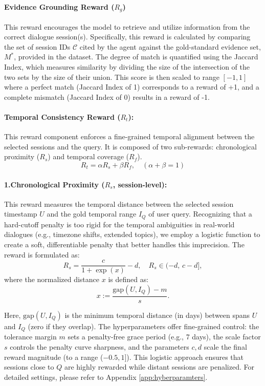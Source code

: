 \documentclass{article} %
\begin{document}
\paragraph{Evidence Grounding Reward ($R_g$)} 
This reward encourages the model to retrieve and utilize information from the correct dialogue session(s). Specifically, this reward is calculated by comparing the set of session IDs $\mathcal{C}$ cited by the agent against the gold-standard evidence set, $M^*$, provided in the dataset. The degree of match is quantified using the Jaccard Index, which measures similarity by dividing the size of the intersection of the two sets by the size of their union. This score is then scaled to range $[-1, 1]$  where a perfect match (Jaccard Index of 1) corresponds to a reward of +1, and a complete mismatch (Jaccard Index of 0) results in a reward of -1.

\paragraph{Temporal Consistency Reward ($R_t$):}
This reward component enforces a fine-grained temporal alignment between the selected sessions and the query. It is composed of two sub-rewards: chronological proximity ($R_s$) and temporal coverage ($R_f$).
\begin{equation}
R_t = \alpha R_s + \beta R_f, \quad (\alpha + \beta = 1)
\end{equation}

\paragraph{\textbf{1.Chronological Proximity ($R_s$, session-level):} }
This reward measures the temporal distance between the selected session timestamp $U$ and the gold temporal range $I_Q$ of user query. Recognizing that a hard-cutoff penalty is too rigid for the temporal ambiguities in real-world dialogues (e.g., timezone shifts, extended topics), we employ a logistic function to create a soft, differentiable penalty that better handles this imprecision. The reward is formulated as:
\begin{equation}
R_s = \frac{c}{1 + \exp(x)} - d, \quad R_s \in (-d,\,c-d],
\end{equation}
where the normalized distance $x$ is defined as:
\begin{equation}
x := \frac{\mathrm{gap}(U,I_Q) - m}{s}.
\end{equation}

Here, $\mathrm{gap}(U,I_Q)$ is the minimum temporal distance (in days) between spans $U$ and $I_Q$ (zero if they overlap). The hyperparameters offer fine-grained control: the tolerance margin $m$  sets a penalty-free grace period (e.g., 7 days), the scale factor $s$ controls the penalty curve sharpness, and the parameters $c, d$ scale the final reward magnitude (to a range ($-0.5, 1\rbrack$). This logistic approach ensures that sessions close to $Q$ are highly rewarded while distant sessions are penalized. For detailed settings, please refer to Appendix \ref{app:hyberparamters}.
\end{document}
